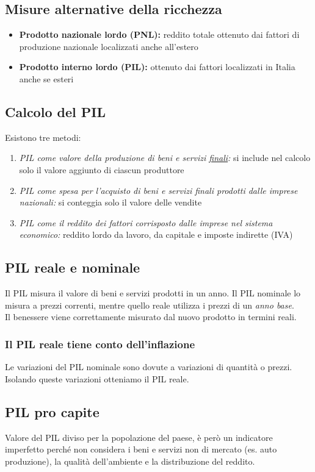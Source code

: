\documentclass{report}
\begin{document}
	\subsection{Misure alternative della ricchezza}
	\begin{itemize}
		\item \textbf{Prodotto nazionale lordo (PNL):} reddito totale ottenuto dai fattori di produzione nazionale localizzati anche all'estero
		\item \textbf{Prodotto interno lordo (PIL):} ottenuto dai fattori localizzati in Italia anche se esteri
	\end{itemize}
	\subsection{Calcolo del PIL}
	Esistono tre metodi:
	\begin{enumerate}
		\item \textit{PIL come valore della produzione di beni e servizi \underline{finali}:} si include nel calcolo solo il valore aggiunto di ciascun produttore
		\item \textit{PIL come spesa per l'acquisto di beni e servizi finali prodotti dalle imprese nazionali:} si conteggia solo il valore delle vendite
		\item \textit{PIL come il reddito dei fattori corrisposto dalle imprese nel sistema economico:} reddito lordo da lavoro, da capitale e imposte indirette (IVA)
	\end{enumerate}
	\subsection{PIL reale e nominale}
	Il PIL misura il valore di beni e servizi prodotti in un anno. Il PIL nominale lo misura a prezzi correnti, mentre quello reale utilizza i prezzi di un \textit{anno base}.
	\medskip \\
	Il benessere viene correttamente misurato dal nuovo prodotto in termini reali.
	\subsubsection{Il PIL reale tiene conto dell'inflazione}
	Le variazioni del PIL nominale sono dovute a variazioni di quantità o prezzi. Isolando queste variazioni otteniamo il PIL reale.
	\subsection{PIL pro capite}
	Valore del PIL diviso per la popolazione del paese, è però un indicatore imperfetto perché non considera i beni e servizi non di mercato (es. auto produzione), la qualità dell'ambiente e la distribuzione del reddito.
\end{document}
